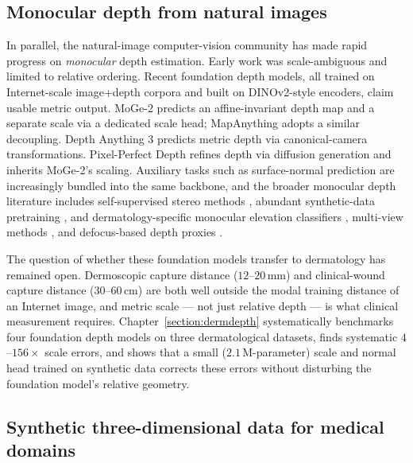 \documentclass[11pt]{ucthesis}
\begin{document}
\subsection{Monocular depth from natural images}

In parallel, the natural-image computer-vision community has made rapid progress on \emph{monocular} depth estimation. Early work was scale-ambiguous and limited to relative ordering. Recent foundation depth models, all trained on Internet-scale image+depth corpora and built on DINOv2-style \cite{oquab2023dinov2} encoders, claim usable metric output. MoGe-2 \cite{wang2025moge2} predicts an affine-invariant depth map and a separate scale via a dedicated scale head; MapAnything \cite{keetha2026mapanything} adopts a similar decoupling. Depth Anything 3 \cite{depthanything3} predicts metric depth via canonical-camera transformations. Pixel-Perfect Depth \cite{xu2025pixel} refines depth via diffusion generation and inherits MoGe-2's scaling. Auxiliary tasks such as surface-normal prediction \cite{Tosi2021CVPR} are increasingly bundled into the same backbone, and the broader monocular depth literature includes self-supervised stereo methods \cite{pacheco-2020}, abundant synthetic-data pretraining \cite{tartanair2020iros,yao2020blendedmvs,yeshwanthliu2023scannetpp}, and dermatology-specific monocular elevation classifiers \cite{abhishek2024lesion}, multi-view methods \cite{zhang-2025}, and defocus-based depth proxies \cite{parekh-2024}.

The question of whether these foundation models transfer to dermatology has remained open. Dermoscopic capture distance ($12$--$20$\,mm) and clinical-wound capture distance ($30$--$60$\,cm) are both well outside the modal training distance of an Internet image, and metric scale --- not just relative depth --- is what clinical measurement requires. Chapter~\ref{section:dermdepth} systematically benchmarks four foundation depth models on three dermatological datasets, finds systematic $4$--$156\times$ scale errors, and shows that a small ($2.1$\,M-parameter) scale and normal head trained on synthetic data corrects these errors without disturbing the foundation model's relative geometry.

\subsection{Synthetic three-dimensional data for medical domains}
\end{document}
